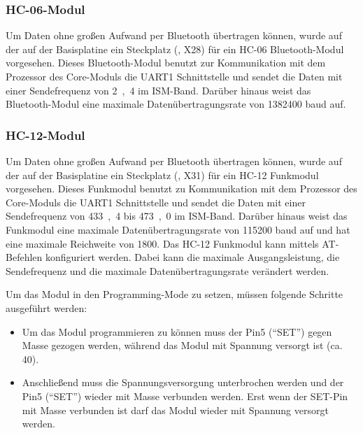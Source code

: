 
\subsubsection{HC-06-Modul}
Um Daten ohne großen Aufwand per Bluetooth übertragen können, wurde auf der auf der \gls{Basisplatine} ein Steckplatz (, X28) für ein HC-06 Bluetooth-Modul vorgesehen. Dieses Bluetooth-Modul benutzt zur Kommunikation mit dem Prozessor des \gls{Core-Modul}s die UART1 Schnittstelle und sendet die Daten mit einer Sendefrequenz von \unit{2,4}{\giga\hertz} im ISM-Band. Darüber hinaus weist das Bluetooth-Modul eine maximale Datenübertragungsrate von 1382400 baud auf.


\subsubsection{HC-12-Modul}
Um Daten ohne großen Aufwand per Bluetooth übertragen können, wurde auf der auf der \gls{Basisplatine} ein Steckplatz (, X31) für ein HC-12 Funkmodul vorgesehen. Dieses Funkmodul benutzt zu Kommunikation mit dem Prozessor des \gls{Core-Modul}s die UART1 Schnittstelle und sendet die Daten mit einer Sendefrequenz von \unit{433,4}{\mega\hertz} bis \unit{473,0}{\mega\hertz} im ISM-Band. Darüber hinaus weist das Funkmodul eine maximale Datenübertragungsrate von 115200 baud auf und hat eine maximale Reichweite von \unit{1800}{\metre}. Das HC-12 Funkmodul kann mittels AT-Befehlen konfiguriert werden. Dabei kann die maximale Ausgangsleistung, die Sendefrequenz und die maximale Datenübertragungsrate verändert werden.


Um das Modul in den Programming-Mode zu setzen, müssen folgende Schritte ausgeführt werden:
\begin{itemize}
    \item Um das Modul programmieren zu können muss der Pin5 (\enquote{SET}) gegen Masse gezogen werden, während das Modul mit Spannung versorgt ist (ca. \unit{40}{\milli\second}).
    \item Anschließend muss die Spannungsversorgung unterbrochen werden und der Pin5 (\enquote{SET}) wieder mit Masse verbunden werden. Erst wenn der SET-Pin mit Masse verbunden ist darf das Modul wieder mit Spannung versorgt werden.
\end{itemize}

